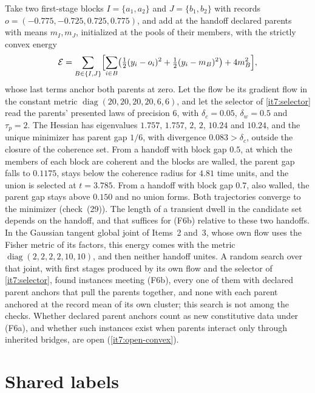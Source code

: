 \documentclass[11pt,letterpaper]{report}
\begin{document}
Take two first-stage blocks $I=\{a_1,a_2\}$ and $J=\{b_1,b_2\}$ with records $o=(-0.775,-0.725,0.725,0.775)$, and add at the handoff declared parents with means $m_I,m_J$, initialized at the pools of their members, with the strictly convex energy
\begin{equation}
\mathcal E=\sum_{B\in\{I,J\}}\Bigl[\sum_{i\in B}\bigl(\tfrac12(y_i-o_i)^2+\tfrac12(y_i-m_B)^2\bigr)+4m_B^2\Bigr],
\label{it7:dwell-energy}
\end{equation}
whose last terms anchor both parents at zero. Let the flow be its gradient flow in the constant metric $\operatorname{diag}(20,20,20,20,6,6)$, and let the selector of \cref{it7:selector} read the parents' presented laws of precision $6$, with $\delta_c=0.05$, $\delta_w=0.5$ and $\tau_p=2$. The Hessian has eigenvalues $1.757$, $1.757$, $2$, $2$, $10.24$ and $10.24$, and the unique minimizer has parent gap $1/6$, with divergence $0.083>\delta_c$, outside the closure of the coherence set. From a handoff with block gap $0.5$, at which the members of each block are coherent and the blocks are walled, the parent gap falls to $0.1175$, stays below the coherence radius for $4.81$ time units, and the union is selected at $t=3.785$. From a handoff with block gap $0.7$, also walled, the parent gap stays above $0.150$ and no union forms. Both trajectories converge to the minimizer (check~(29)). The length of a transient dwell in the candidate set depends on the handoff, and that suffices for (F6b) relative to these two handoffs. In the Gaussian tangent global joint of Items~2 and~3, whose own flow uses the Fisher metric of its factors, this energy comes with the metric $\operatorname{diag}(2,2,2,2,10,10)$, and then neither handoff unites. A random search over that joint, with first stages produced by its own flow and the selector of \cref{it7:selector}, found instances meeting (F6b), every one of them with declared parent anchors that pull the parents together, and none with each parent anchored at the record mean of its own cluster; this search is not among the checks. Whether declared parent anchors count as new constitutive data under (F6a), and whether such instances exist when parents interact only through inherited bridges, are open (\cref{it7:open-convex}).

\chapter{Shared labels}
\label{it7:ch-shared}
\end{document}
